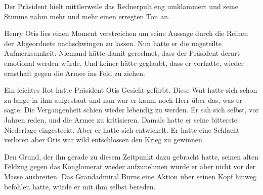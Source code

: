 \par

Der Präsident hielt mittlerweile das Rednerpult eng umklammert und seine Stimme nahm mehr und mehr einen erregten Ton an.

\par

Henry Otis lies einen Moment verstreichen um seine Aussage durch die Reihen der Abgeordnete nachschwingen zu lassen.
Nun hatte er die ungeteilte Aufmerksamkeit.
Niemand hätte damit gerechnet, dass der Präsident derart emotional werden würde.
Und keiner hätte geglaubt, dass er vorhatte, wieder ernsthaft gegen die Armee ins Feld zu ziehen.

\par


\par

Ein leichtes Rot hatte Präsident Otis Gesicht gefärbt.
Diese Wut hatte sich schon zu lange in ihm aufgestaut und nun war er kaum noch Herr über das, was er sagte.
Die Vergangenheit schien wieder lebendig zu werden.
Er sah sich selbst, vor Jahren reden, und die Armee zu kritisieren.
Damals hatte er seine bitterste Niederlage eingesteckt.
Aber er hatte sich entwickelt.
Er hatte eine Schlacht verloren aber Otis war wild entschlossen den Krieg zu gewinnen.

\par

Den Grund, der ihn gerade zu diesem Zeitpunkt dazu gebracht hatte, seinen alten Feldzug gegen das Konglomerat wieder aufzunehmen würde er aber nicht vor der Masse ausbreiten.
Das Grandadmiral Burns eine Aktion über seinen Kopf hinweg befohlen hatte, würde er mit ihm selbst bereden.

